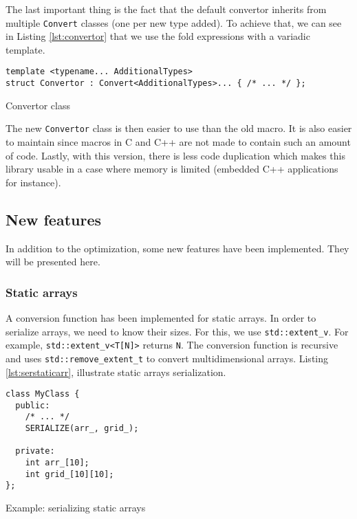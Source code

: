 The last important thing is the fact that the default convertor inherits from
multiple \texttt{Convert} classes (one per new type added). To achieve that, we
can see in Listing \ref{lst:convertor} that we use the fold expressions with
a variadic template.

\begin{listing}[ht!]
\begin{verbatim}
template <typename... AdditionalTypes>
struct Convertor : Convert<AdditionalTypes>... { /* ... */ };
\end{verbatim}
\caption{Convertor class}
\label{lst:convertor}
\end{listing}

The new \texttt{Convertor} class is then easier to use than the old macro. It
is also easier to maintain since macros in C and C++ are not made to contain
such an amount of code. Lastly, with this version, there is less code
duplication which makes this library usable in a case where memory is limited
(embedded C++ applications for instance).

\subsection{New features}

In addition to the optimization, some new features have been implemented. They
will be presented here.

\subsubsection{Static arrays}

A conversion function has been implemented for static arrays. In order to
serialize arrays, we need to know their sizes. For this, we use
\texttt{std::extent\_v}. For example, \texttt{std::extent\_v<T[N]>} returns
\texttt{N}. The conversion function is recursive and uses
\texttt{std::remove\_extent\_t} to convert multidimensional arrays. Listing
\ref{lst:serstaticarr}, illustrate static arrays serialization.

\begin{listing}[ht!]
\begin{verbatim}
class MyClass {
  public:
    /* ... */
    SERIALIZE(arr_, grid_);

  private:
    int arr_[10];
    int grid_[10][10];
};
\end{verbatim}
\caption{Example: serializing static arrays}
\label{lst:serstaticarr}
\end{listing}

